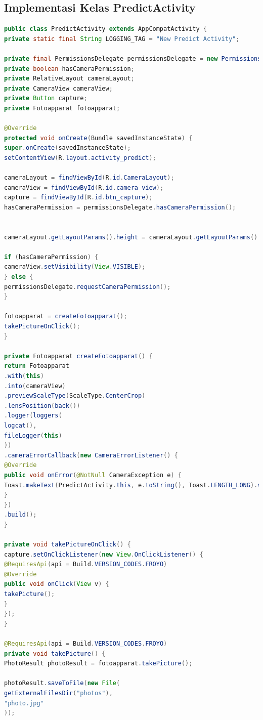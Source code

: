 \subsection{Implementasi Kelas PredictActivity}
\begin{lstlisting}[language=Java, caption=Implementasi Kelas PredictActivity, label=code:predict, firstnumber=48]
public class PredictActivity extends AppCompatActivity {
private static final String LOGGING_TAG = "New Predict Activity";

private final PermissionsDelegate permissionsDelegate = new PermissionsDelegate(this);
private boolean hasCameraPermission;
private RelativeLayout cameraLayout;
private CameraView cameraView;
private Button capture;
private Fotoapparat fotoapparat;

@Override
protected void onCreate(Bundle savedInstanceState) {
super.onCreate(savedInstanceState);
setContentView(R.layout.activity_predict);

cameraLayout = findViewById(R.id.CameraLayout);
cameraView = findViewById(R.id.camera_view);
capture = findViewById(R.id.btn_capture);
hasCameraPermission = permissionsDelegate.hasCameraPermission();


cameraLayout.getLayoutParams().height = cameraLayout.getLayoutParams().width;

if (hasCameraPermission) {
cameraView.setVisibility(View.VISIBLE);
} else {
permissionsDelegate.requestCameraPermission();
}

fotoapparat = createFotoapparat();
takePictureOnClick();
}

private Fotoapparat createFotoapparat() {
return Fotoapparat
.with(this)
.into(cameraView)
.previewScaleType(ScaleType.CenterCrop)
.lensPosition(back())
.logger(loggers(
logcat(),
fileLogger(this)
))
.cameraErrorCallback(new CameraErrorListener() {
@Override
public void onError(@NotNull CameraException e) {
Toast.makeText(PredictActivity.this, e.toString(), Toast.LENGTH_LONG).show();
}
})
.build();
}

private void takePictureOnClick() {
capture.setOnClickListener(new View.OnClickListener() {
@RequiresApi(api = Build.VERSION_CODES.FROYO)
@Override
public void onClick(View v) {
takePicture();
}
});
}

@RequiresApi(api = Build.VERSION_CODES.FROYO)
private void takePicture() {
PhotoResult photoResult = fotoapparat.takePicture();

photoResult.saveToFile(new File(
getExternalFilesDir("photos"),
"photo.jpg"
));


\end{lstlisting}
